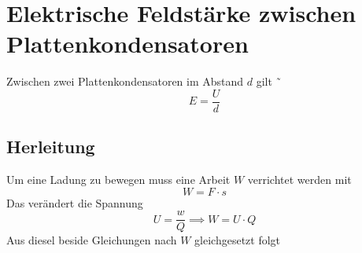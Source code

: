 \documentclass{article}
\begin{document}
 
\section{Elektrische Feldstärke zwischen Plattenkondensatoren} 
Zwischen zwei Plattenkondensatoren im Abstand $d$ gilt
˜\[
 E=\frac{U}{d} 
\]
 
\subsection{Herleitung}
Um eine Ladung zu bewegen muss eine Arbeit $W$ verrichtet werden mit
\[
 W=F \cdot s
\]
Das verändert die Spannung
\[
 U = \frac{w}{Q} \implies W = U \cdot Q 
\]
Aus diesel beside Gleichungen nach $W$ gleichgesetzt folgt 
\end{document}
